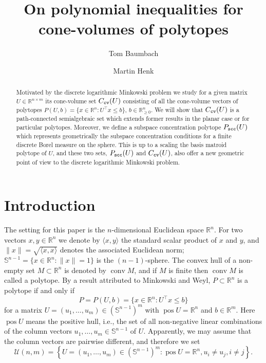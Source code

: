 \documentclass[11pt, a4paper, twoside, reqno]{amsart}
\DeclareMathOperator*{\pos}{pos}
\DeclareMathOperator*{\conv}{conv}
\newcommand{\R}{\mathbb{R}}
\theoremstyle{definition}
\theoremstyle{remark}
\newcommand{\Sn}{\mathbb{S}^{n-1}}
\newcommand{\sph}{\mathbb{S}}%
\numberwithin{equation}{section}
\begin{document}
\title{On polynomial inequalities for cone-volumes of polytopes}
\author{Tom Baumbach}
\author{Martin Henk}

\address{Technische Universität Berlin, Institut für Mathematik, Sekr.~MA4-1, Straße des 17.~Juni 136, 10623 Berlin, Germany}

       \begin{abstract}
         Motivated by the discrete logarithmic Minkowski problem we study for a
given matrix $U\in\mathbb{R}^{n\times m}$  its cone-volume set $C_{\tt cv}(U)$ 
consisting of all the cone-volume vectors of polytopes 
$P(U,b)=\{ x\in\mathbb{R}^n : U^\intercal  x\leq b\}$,
$b\in\mathbb{R}^n_{\geq 0}$. We will show that $C_{\tt cv}(U)$ is a
path-connected semialgebraic
set which extends former results in the planar
case or for particular polytopes. Moreover, we define 
a subspace concentration polytope $P_{\tt scc}(U)$ which represents geometrically  the subspace
concentration conditions for a finite discrete Borel measure
on the sphere.  This is up to a scaling the 
basis matroid polytope of $U$, and these two sets, $P_{\tt scc}(U)$ and
$C_{\tt cv}(U)$, also offer a new geometric 
point of view to the discrete logarithmic Minkowski
problem. 
       \end{abstract}



   \maketitle

	\section{Introduction}
The setting for this paper is the $n$-dimensional Euclidean space $\R^n$. For two vectors $x,y \in \R^n$ we denote by $\langle x,y \rangle$ the standard scalar product of $x$ and $y$, and  $\| x \| = \sqrt{\langle x,x \rangle}$  denotes the associated Euclidean norm; $\sph^{n-1}=\{x\in\R^n : \| x \|=1\}$ is the $(n-1)$-sphere.  The convex hull of a non-empty set $M\subset\R^n$ is denoted by $\conv M$, and if $M$ is finite then $\conv M$ is called a polytope.     By a result attributed to Minkowski and Weyl, $P\subset\R^n$ is a polytope if and only if 
    \begin{equation*}
       P=P(U,b)=\{x\in\R^n : U^\intercal x\leq b\}
    \end{equation*}
    for a  matrix $U=(u_1,\dots,u_m)\in(\Sn)^m$ with $\pos U=\R^n$ and $b\in\R^m$. 
    Here $\pos U$ means the positive hull, i.e., the set of all non-negative linear combinations of the column vectors $u_1,\dots,u_m\in\Sn$ of $U$.  Apparently, we may assume that the column vectors are pairwise different, and therefore we set
    \begin{equation*}
      \mathcal{U}(n,m)=\left \{U=(u_1,\dots,u_m)\in(\Sn)^m : \pos U=\R^n, u_i\ne u_j, i \ne j\right\}. 
    \end{equation*}
\end{document}
